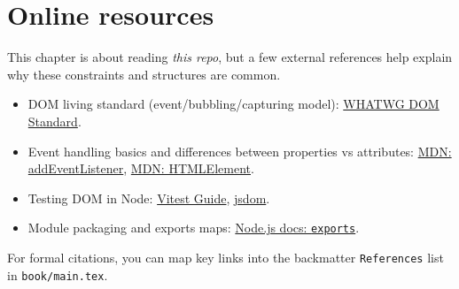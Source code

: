 \section{Online resources}
This chapter is about reading \emph{this repo}, but a few external references help explain why these constraints and structures are common.

\begin{itemize}
  \item DOM living standard (event/bubbling/capturing model):
    \href{https://dom.spec.whatwg.org/}{WHATWG DOM Standard}.
  \item Event handling basics and differences between properties vs attributes:
    \href{https://developer.mozilla.org/en-US/docs/Web/API/EventTarget/addEventListener}{MDN: addEventListener},
    \href{https://developer.mozilla.org/en-US/docs/Web/API/HTMLElement}{MDN: HTMLElement}.
  \item Testing DOM in Node:
    \href{https://vitest.dev/guide/}{Vitest Guide},
    \href{https://github.com/jsdom/jsdom}{jsdom}.
  \item Module packaging and exports maps:
    \href{https://nodejs.org/api/packages.html#packages_exports}{Node.js docs: \texttt{exports}}.
\end{itemize}

For formal citations, you can map key links into the backmatter \texttt{References} list in \texttt{book/main.tex}.
